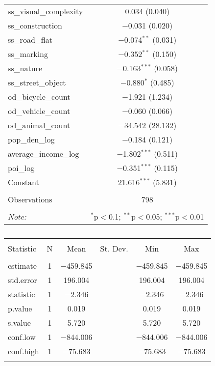 \begin{table}[!htbp]
\begin{tabular}{@{\extracolsep{1pt}}lc}
  ss\_visual\_complexity & 0.034 (0.040) \\ 
  ss\_construction & $-$0.031 (0.020) \\ 
  ss\_road\_flat & $-$0.074$^{**}$ (0.031) \\ 
  ss\_marking & $-$0.352$^{**}$ (0.150) \\ 
  ss\_nature & $-$0.163$^{***}$ (0.058) \\ 
  ss\_street\_object & $-$0.880$^{*}$ (0.485) \\ 
  od\_bicycle\_count & $-$1.921 (1.234) \\ 
  od\_vehicle\_count & $-$0.060 (0.066) \\ 
  od\_animal\_count & $-$34.542 (28.132) \\ 
  pop\_den\_log & $-$0.184 (0.121) \\ 
  average\_income\_log & $-$1.802$^{***}$ (0.511) \\ 
  poi\_log & $-$0.351$^{***}$ (0.115) \\ 
  Constant & 21.616$^{***}$ (5.831) \\ 
 \hline \\[-1.8ex] 
Observations & 798 \\ 
\hline 
\hline \\[-1.8ex] 
\textit{Note:}  & \multicolumn{1}{r}{$^{*}$p$<$0.1; $^{**}$p$<$0.05; $^{***}$p$<$0.01} \\ 
\end{tabular} 
\end{table} 

\begin{table}[!htbp] \centering 
  \caption{} 
  \label{} 
\small 
\begin{tabular}{@{\extracolsep{1pt}}lccccc} 
\\[-1.8ex]\hline 
\hline \\[-1.8ex] 
Statistic & \multicolumn{1}{c}{N} & \multicolumn{1}{c}{Mean} & \multicolumn{1}{c}{St. Dev.} & \multicolumn{1}{c}{Min} & \multicolumn{1}{c}{Max} \\ 
\hline \\[-1.8ex] 
estimate & 1 & $-$459.845 &  & $-$459.845 & $-$459.845 \\ 
std.error & 1 & 196.004 &  & 196.004 & 196.004 \\ 
statistic & 1 & $-$2.346 &  & $-$2.346 & $-$2.346 \\ 
p.value & 1 & 0.019 &  & 0.019 & 0.019 \\ 
s.value & 1 & 5.720 &  & 5.720 & 5.720 \\ 
conf.low & 1 & $-$844.006 &  & $-$844.006 & $-$844.006 \\ 
conf.high & 1 & $-$75.683 &  & $-$75.683 & $-$75.683 \\ 
\hline \\[-1.8ex] 
\end{tabular} 
\end{table} 

